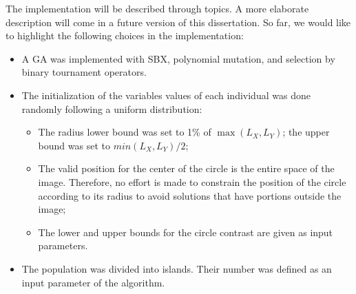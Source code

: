 			The implementation will be described through topics. A more elaborate description will come in a future version of this dissertation. So far, we would like to highlight the following choices in the implementation:
			\begin{itemize}
				\item A GA was implemented with SBX, polynomial mutation, and selection by binary tournament operators.
				\item The initialization of the variables values of each individual was done randomly following a uniform distribution:
				\begin{itemize}
					\item The radius lower bound was set to 1\% of $\max(L_X,L_Y)$; the upper bound was set to $min(L_X,L_Y)/2$;
					\item The valid position for the center of the circle is the entire space of the image. Therefore, no effort is made to constrain the position of the circle according to its radius to avoid solutions that have portions outside the image;
					\item The lower and upper bounds for the circle contrast are given as input parameters.
				\end{itemize}
				\item The population was divided into islands. Their number was defined as an input parameter of the algorithm.

\end{itemize}
